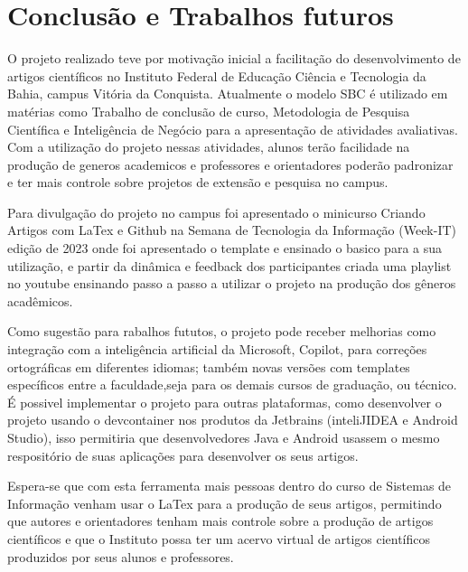 \section{Conclusão e Trabalhos futuros}

O projeto realizado teve por motivação inicial a facilitação do desenvolvimento de artigos científicos no Instituto Federal de Educação Ciência e Tecnologia da Bahia, campus Vitória da Conquista. Atualmente o modelo SBC é utilizado em matérias como Trabalho de conclusão de curso, Metodologia de Pesquisa Científica e Inteligência de Negócio para a apresentação de atividades avaliativas. Com a utilização do projeto nessas atividades, alunos terão facilidade na produção de generos academicos e professores e orientadores poderão padronizar e ter mais controle sobre projetos de extensão e pesquisa no campus.

Para divulgação do projeto no campus foi apresentado o minicurso Criando Artigos com LaTex e Github na Semana de Tecnologia da Informação (Week-IT) edição de 2023 onde foi apresentado o template e ensinado o basico para a sua utilização, e partir da dinâmica e feedback dos participantes criada uma playlist no youtube ensinando passo a passo a utilizar o projeto na produção dos gêneros acadêmicos.

Como sugestão para rabalhos fututos, o projeto pode receber melhorias como integração com a inteligência artificial da Microsoft, Copilot, para correções ortográficas em diferentes idiomas; também novas versões com templates específicos entre a faculdade,seja para os demais cursos de graduação, ou técnico. É possivel implementar o projeto para outras plataformas, como desenvolver o projeto usando o devcontainer nos produtos da Jetbrains (inteliJIDEA e Android Studio), isso permitiria que desenvolvedores Java e Android usassem o mesmo respositório de suas aplicações para desenvolver os seus artigos.

Espera-se que com esta ferramenta mais pessoas dentro do curso de Sistemas de Informação venham usar o LaTex para a produção de seus artigos, permitindo que autores e orientadores tenham mais controle sobre a produção de artigos científicos e que o Instituto possa ter um acervo virtual de artigos científicos produzidos por seus alunos e professores.